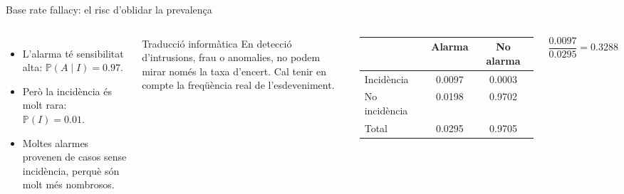 \documentclass[10pt,aspectratio=169]{beamer}
\newcommand{\Prob}{\mathbb{P}}
\begin{document}
\begin{frame}{Base rate fallacy: el risc d'oblidar la prevalença}
\begin{columns}[T]
\begin{itemize}
  \item L'alarma té sensibilitat alta: $\Prob(A\mid I)=0.97$.
  \item Però la incidència és molt rara: $\Prob(I)=0.01$.
  \item Moltes alarmes provenen de casos sense incidència, perquè són molt més nombrosos.
\end{itemize}
\vspace{0.1cm}
\begin{block}{Traducció informàtica}
En detecció d'intrusions, frau o anomalies, no podem mirar només la taxa d'encert. Cal tenir en compte la freqüència real de l'esdeveniment.
\end{block}
\centering
\small
\begin{tabular}{lcc}
\toprule
 & Alarma & No alarma \\
\midrule
Incidència & 0.0097 & 0.0003 \\
No incidència & 0.0198 & 0.9702 \\
\midrule
Total & 0.0295 & 0.9705 \\
\bottomrule
\end{tabular}
\vspace{0.2cm}
\[
\frac{0.0097}{0.0295}=0.3288
\]
\end{columns}
\end{frame}
\end{document}
